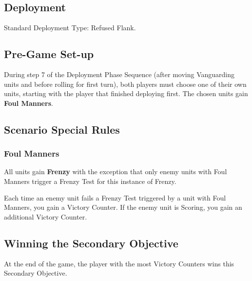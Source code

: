 
\label{FoulManners}


\subsection*{Deployment}

Standard Deployment Type: Refused Flank.


\subsection*{Pre-Game Set-up}

During step 7 of the Deployment Phase Sequence (after moving Vanguarding units and before rolling for first turn), both players must choose one of their own units, starting with the player that finished deploying first. The chosen units gain \textbf{Foul Manners}.

\subsection*{Scenario Special Rules}

\subsubsection*{Foul Manners}

All units gain \textbf{Frenzy} with the exception that only enemy units with Foul Manners trigger a Frenzy Test for this instance of Frenzy.

Each time an enemy unit fails a Frenzy Test triggered by a unit with Foul Manners, you gain a Victory Counter. If the enemy unit is Scoring, you gain an additional Victory Counter. 

\subsection*{Winning the Secondary Objective}

At the end of the game, the player with the most Victory Counters wins this Secondary Objective.
